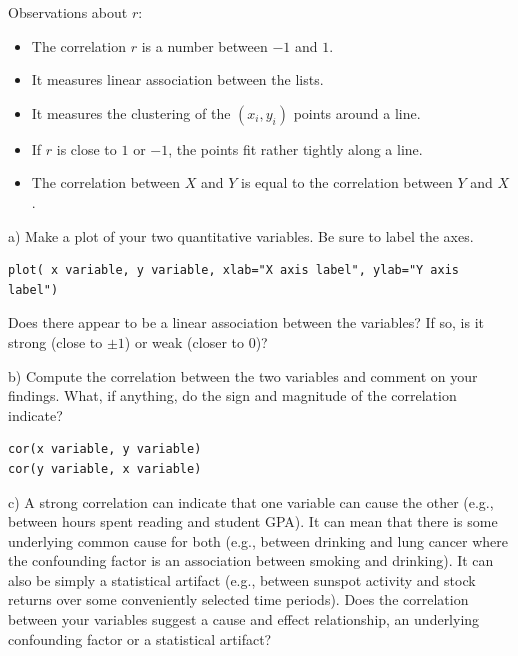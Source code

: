 \documentclass[10pt]{article}
\begin{document}
Observations about $r$:
\begin{itemize}
\item The correlation $r$ is a number between $-1$ and $1$.
\item It measures linear association between the lists.
\item It measures the clustering of the $(x_i, y_i)$ points around a line.
\item If $r$ is close to $1$ or $-1$, the points fit rather tightly along a line.
\item The correlation between $X$ and $Y$ is equal to the correlation between $Y$ and $X$.
\end{itemize}
\smallskip

\hspace{10pt} a) Make a plot of your two quantitative variables.  Be sure to label the axes.
\vspace{-6pt}
\begin{verbatim}
plot( x variable, y variable, xlab="X axis label", ylab="Y axis label")
\end{verbatim}
Does there appear to be a linear association between the variables?  
If so, is it strong (close to $\pm 1$) or weak (closer to 0)?
\medskip

\hspace{10pt} b) Compute the correlation between the two variables and comment on your 
findings. What, if anything, do the sign and magnitude of the correlation indicate?\vspace{-6pt}
\begin{verbatim}
cor(x variable, y variable)
cor(y variable, x variable)
\end{verbatim}

\hspace{10pt} c)  A strong correlation can indicate that one variable can cause the 
other (e.g., between hours spent reading and student GPA).  It 
can mean that there is some underlying common cause for both (e.g., between drinking and lung
cancer where the confounding factor is an association between smoking and drinking).  
It can also be simply a statistical artifact (e.g., between sunspot activity and stock returns
over some conveniently selected time periods).  Does the correlation between your variables
suggest a cause and effect relationship, an underlying confounding factor or a statistical
artifact?
\vfill
\eject
\end{document}
